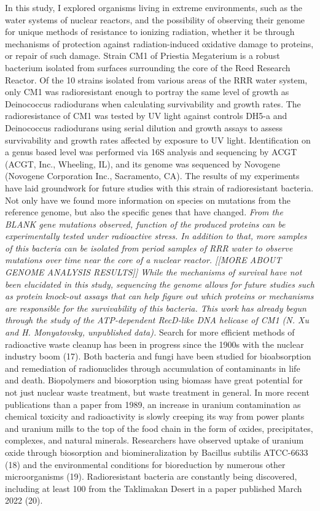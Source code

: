 \documentclass[12pt,twoside]{reedthesis}
\begin{document}
In this study, I explored organisms living in extreme environments, such as the water systems of nuclear reactors, and the possibility of observing their genome for unique methods of resistance to ionizing radiation, whether it be through mechanisms of protection against radiation-induced oxidative damage to proteins, or repair of such damage. Strain CM1 of Priestia Megaterium is a robust bacterium isolated from surfaces surrounding the core of the Reed Research Reactor. Of the 10 strains isolated from various areas of the RRR water system, only CM1 was radioresistant enough to portray the same level of growth as Deinococcus radiodurans when calculating survivability and growth rates. The radioresistance of CM1 was tested by UV light against controls DH5-a and Deinococcus radiodurans using serial dilution and growth assays to assess survivability and growth rates affected by exposure to UV light. Identification on a genus based level was performed via 16S analysis and sequencing by ACGT (ACGT, Inc., Wheeling, IL), and its genome was sequenced by Novogene (Novogene Corporation Inc., Sacramento, CA).
The results of my experiments have laid groundwork for future studies with this strain of radioresistant bacteria. Not only have we found more information on species on mutations from the reference genome, but also the specific genes that have changed. \emph{From the BLANK gene mutations observed, function of the produced proteins can be experimentally tested under radioactive stress. In addition to that, more samples of this bacteria can be isolated from period samples of RRR water to observe mutations over time near the core of a nuclear reactor. {[}{[}MORE ABOUT GENOME ANALYSIS RESULTS{]}{]} While the mechanisms of survival have not been elucidated in this study, sequencing the genome allows for future studies such as protein knock-out assays that can help figure out which proteins or mechanisms are responsible for the survivability of this bacteria. This work has already begun through the study of the ATP-dependent RecD-like DNA helicase of CM1 (N. Xu and H. Monyatovsky, unpublished data).}
Search for more efficient methods of radioactive waste cleanup has been in progress since the 1900s with the nuclear industry boom (17). Both bacteria and fungi have been studied for bioabsorption and remediation of radionuclides through accumulation of contaminants in life and death. Biopolymers and biosorption using biomass have great potential for not just nuclear waste treatment, but waste treatment in general. In more recent publications than a paper from 1989, an increase in uranium contamination as chemical toxicity and radioactivity is slowly creeping its way from power plants and uranium mills to the top of the food chain in the form of oxides, precipitates, complexes, and natural minerals. Researchers have observed uptake of uranium oxide through biosorption and biomineralization by Bacillus subtilis ATCC-6633 (18) and the environmental conditions for bioreduction by numerous other microorganisms (19). Radioresistant bacteria are constantly being discovered, including at least 100 from the Taklimakan Desert in a paper published March 2022 (20).
\end{document}
